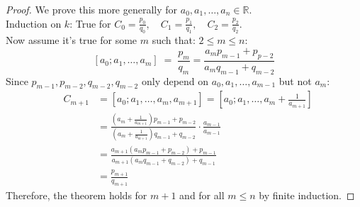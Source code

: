 \documentclass{report}
\begin{document}
\begin{proof} We prove this more generally for $a_0,a_1,\dots,a_n \in \mathbb{R}.$\\
							Induction on $k$: True for $C_0=\frac{p_0}{q_0},\quad C_1=\frac{p_1}{q_1},\quad C_2=\frac{p_2}{q_2}$.\\
							Now assume it's true for some $m$ such that: $2\leq m \leq n$: \[[a_0;a_1,\dots,a_m]\;=\;\frac{p_m}{q_m}=\frac{a_mp_{m-1}+p_{p-2}}{a_mq_{m-1}+q_{m-2}}\]
							Since $p_{m-1},p_{m-2},q_{m-2},q_{m-2}$ only depend on $a_0,a_1,\dots,a_{m-1}$ but not $a_m$:
																																							\[\begin{array}{lcl}
																																									&C_{m+1}&=[a_0;a_1,\dots,a_m,a_{m+1}]=[a_0;a_1,\dots,a_m+\frac{1}{a_{m+1}}]\\
																																									&&=\frac{(a_m+\frac{1}{a_{m+1}})p_{m-1}+p_{m-2}}{(a_m+\frac{1}{a_{m+1}})q_{m-1}+q_{m-2}} \cdot \frac{a_{m-1}}{a_{m-1}}\\
																																									&&=\frac{a_{m+1}(a_mp_{m-1}+p_{m-2})+p_{m-1}}{a_{m+1}(a_mq_{m-1}+q_{m-2})+q_{m-1}}\\
																																									&&=\frac{p_{m+1}}{q_{m+1}}
																																								\end{array}\]
							Therefore, the theorem holds for $m+1$ and for all $m\leq n$ by finite induction.
\end{proof}
\end{document}
